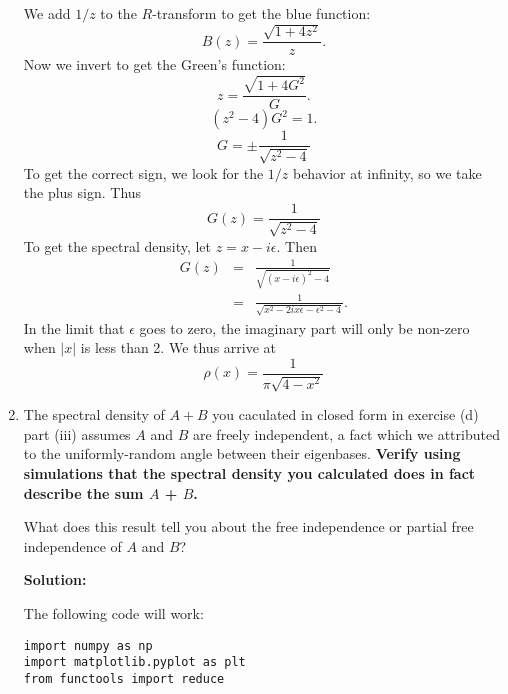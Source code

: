 \documentclass[a4paper]{article}
\begin{document}
\begin{enumerate}[label=(\alph*)]
\begin{tcolorbox}
We add $1/z$ to the $R$-transform to get the blue function:
\begin{equation}
    B(z) = \frac{\sqrt{1 + 4 z^2}}{z}.
\end{equation}
Now we invert to get the Green's function:
\begin{equation}
    z = \frac{\sqrt{1 + 4 G^2}}{G}.
\end{equation}
\begin{equation}
    (z^2 - 4) G^2 = 1.
\end{equation}
\begin{equation}
    G = \pm\frac{1}{\sqrt{z^2 - 4}}
\end{equation}
To get the correct sign, we look for the $1/z$ behavior at infinity, so we take the plus sign.  
Thus 
\begin{equation}
    G(z) = \frac{1}{\sqrt{z^2 - 4}}
\end{equation}
To get the spectral density, let $z = x - i\epsilon$. Then 
\begin{eqnarray}
    G(z) &=& \frac{1}{\sqrt{(x - i\epsilon)^2 - 4}} \\
    &=& \frac{1}{\sqrt{x^2 - 2ix\epsilon - \epsilon^2 - 4}}.
\end{eqnarray}
In the limit that $\epsilon$ goes to zero, the imaginary part will only be non-zero when $|x|$ is less than 2.  We thus arrive at 
\begin{equation}
    \rho(x) = \frac{1}{\pi\sqrt{4-x^2}}
\end{equation}
\end{tcolorbox}

\item The spectral density of $A+B$ you caculated in closed form in exercise (d) part (iii) assumes $A$ and $B$ are freely independent, a fact which we attributed to the uniformly-random angle between their eigenbases. \textbf{Verify using simulations that the spectral density you calculated does in fact describe the sum $A$ + $B$.}

What does this result tell you about the free independence or partial free independence of $A$ and $B$?

\begin{tcolorbox}
\textbf{Solution:}

The following code will work:

\begin{lstlisting}
import numpy as np
import matplotlib.pyplot as plt
from functools import reduce


\end{lstlisting}
\end{tcolorbox}
\end{enumerate}
\end{document}
